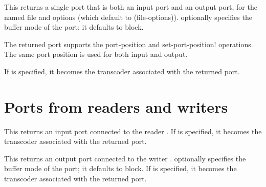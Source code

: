 \begin{entry}{%
}
   
This returns a single port that is both an input port and an output
port, for the named file and options (which default to {\cf
  (file-options)}).   optionally specifies the buffer
mode of the port; it defaults to {\cf block}.
   
The returned port supports the {\cf port-position} and {\cf
  set-port-position!}  operations. The same port position is used for
both input and output.

If  is specified, it becomes the transcoder associated
with the returned port.
\end{entry}

\section{Ports from readers and writers}

\begin{entry}{%
}
   
This returns an input port connected to the reader .
If  is specified, it becomes the transcoder associated
with the returned port.
\end{entry}   

\begin{entry}{%
}
   
This returns an output port connected to the writer .
 optionally specifies the buffer mode of the port; it
defaults to {\cf block}.
If  is specified, it becomes the transcoder associated
with the returned port.
\end{entry}

